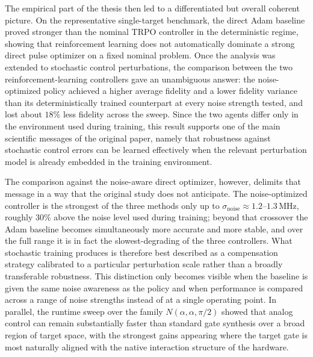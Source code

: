The empirical part of the thesis then led to a differentiated but overall coherent picture. On the representative single-target benchmark, the direct Adam baseline proved stronger than the nominal TRPO controller in the deterministic regime, showing that reinforcement learning does not automatically dominate a strong direct pulse optimizer on a fixed nominal problem. Once the analysis was extended to stochastic control perturbations, the comparison between the two reinforcement-learning controllers gave an unambiguous answer: the noise-optimized policy achieved a higher average fidelity and a lower fidelity variance than its deterministically trained counterpart at every noise strength tested, and lost about \(18\%\) less fidelity across the sweep. Since the two agents differ only in the environment used during training, this result supports one of the main scientific messages of the original paper, namely that robustness against stochastic control errors can be learned effectively when the relevant perturbation model is already embedded in the training environment.

The comparison against the noise-aware direct optimizer, however, delimits that message in a way that the original study does not anticipate. The noise-optimized controller is the strongest of the three methods only up to \(\sigma_{\mathrm{noise}}\approx1.2\)--\(1.3\,\mathrm{MHz}\), roughly \(30\%\) above the noise level used during training; beyond that crossover the Adam baseline becomes simultaneously more accurate and more stable, and over the full range it is in fact the slowest-degrading of the three controllers. What stochastic training produces is therefore best described as a compensation strategy calibrated to a particular perturbation scale rather than a broadly transferable robustness. This distinction only becomes visible when the baseline is given the same noise awareness as the policy and when performance is compared across a range of noise strengths instead of at a single operating point. In parallel, the runtime sweep over the family \(N(\alpha,\alpha,\pi/2)\) showed that analog control can remain substantially faster than standard gate synthesis over a broad region of target space, with the strongest gains appearing where the target gate is most naturally aligned with the native interaction structure of the hardware.

